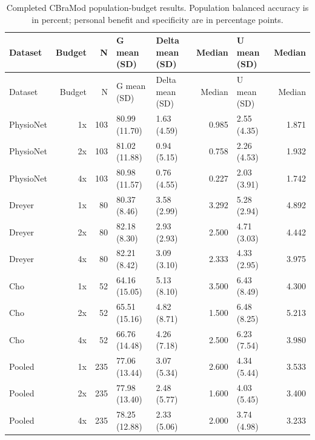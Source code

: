 \begin{longtable}{p{.8in}rrp{.9in}p{1.0in}rp{1.0in}r}
\caption{Completed CBraMod population-budget results. Population balanced accuracy is in percent; personal benefit and specificity are in percentage points.}\label{tab:budget_cbramod}\\
\toprule
Dataset & Budget & N & G mean (SD) & Delta mean (SD) & Median & U mean (SD) & Median \\
\midrule
\endfirsthead
\toprule
Dataset & Budget & N & G mean (SD) & Delta mean (SD) & Median & U mean (SD) & Median \\
\midrule
\endhead
PhysioNet & 1x & 103 & 80.99 (11.70) & 1.63 (4.59) & 0.985 & 2.55 (4.35) & 1.871 \\
PhysioNet & 2x & 103 & 81.02 (11.88) & 0.94 (5.15) & 0.758 & 2.26 (4.53) & 1.932 \\
PhysioNet & 4x & 103 & 80.98 (11.57) & 0.76 (4.55) & 0.227 & 2.03 (3.91) & 1.742 \\
Dreyer & 1x & 80 & 80.37 (8.46) & 3.58 (2.99) & 3.292 & 5.28 (2.94) & 4.892 \\
Dreyer & 2x & 80 & 82.18 (8.30) & 2.93 (2.93) & 2.500 & 4.71 (3.03) & 4.442 \\
Dreyer & 4x & 80 & 82.21 (8.42) & 3.09 (3.10) & 2.333 & 4.33 (2.95) & 3.975 \\
Cho & 1x & 52 & 64.16 (15.05) & 5.13 (8.10) & 3.500 & 6.43 (8.49) & 4.300 \\
Cho & 2x & 52 & 65.51 (15.16) & 4.82 (8.71) & 1.500 & 6.48 (8.25) & 5.213 \\
Cho & 4x & 52 & 66.76 (14.48) & 4.26 (7.18) & 2.500 & 6.23 (7.54) & 3.980 \\
Pooled & 1x & 235 & 77.06 (13.44) & 3.07 (5.34) & 2.600 & 4.34 (5.44) & 3.533 \\
Pooled & 2x & 235 & 77.98 (13.40) & 2.48 (5.77) & 1.600 & 4.03 (5.45) & 3.400 \\
Pooled & 4x & 235 & 78.25 (12.88) & 2.33 (5.06) & 2.000 & 3.74 (4.98) & 3.233 \\
\bottomrule
\end{longtable}
